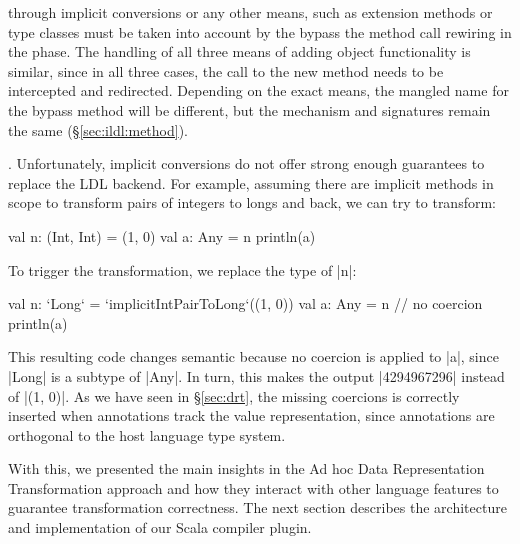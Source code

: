  through implicit conversions or any other means, such as extension methods or type classes must be taken into account by the bypass the method call rewiring in the \coerce{} phase. The handling of all three means of adding object functionality is similar, since in all three cases, the call to the new method needs to be intercepted and redirected. Depending on the exact means, the mangled name for the bypass method will be different, but the mechanism and signatures remain the same (\S\ref{sec:ildl:method}).

. Unfortunately, implicit conversions do not offer strong enough guarantees to replace the LDL backend. For example, assuming there are implicit methods in scope to transform pairs of integers to longs and back, we can try to transform:

\begin{lstlisting-nobreak}
val n: (Int, Int) = (1, 0)
val a: Any = n
println(a)
\end{lstlisting-nobreak}

To trigger the transformation, we replace the type of |n|: %

\begin{lstlisting-nobreak}
val n: `Long` = `implicitIntPairToLong`((1, 0))
val a: Any = n // no coercion
println(a)
\end{lstlisting-nobreak}

This resulting code changes semantic because no coercion is applied to |a|, since |Long| is a subtype of |Any|. In turn, this makes the output |4294967296| instead of |(1, 0)|. As we have seen in \S\ref{sec:drt}, the missing coercions is correctly inserted when annotations track the value representation,
since annotations are orthogonal to the host language type system.

With this, we presented the main insights in the Ad hoc Data Representation Transformation approach and how they interact with other language features to guarantee transformation correctness. The next section describes the architecture and implementation of our Scala compiler plugin.




